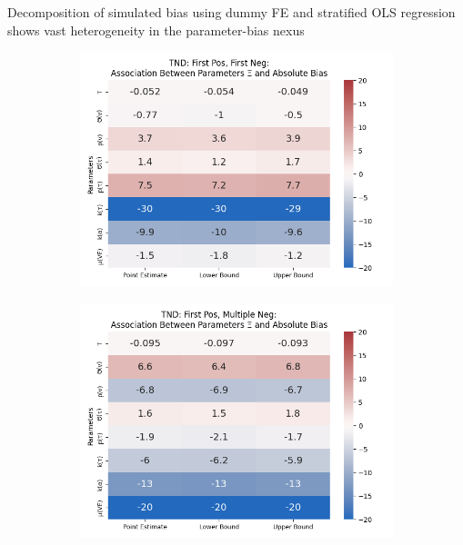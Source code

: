 \documentclass[aspectratio=169]{beamer}
\begin{document}
\begin{frame}{Decomposition of simulated bias using dummy FE and stratified OLS regression shows vast heterogeneity in the parameter-bias nexus}
\begin{figure}[H]
		\begin{subfigure}[t]{0.23\linewidth}
			\centering
			\includegraphics[scale=0.25]{VEMethod_Drivers1b_FEest_Li_MSpec_Heatmap9.png}
		\end{subfigure}
		\begin{subfigure}[t]{0.23\linewidth}
			\centering
			\includegraphics[scale=0.25]{VEMethod_Drivers1b_FEest_Li_MSpec_Heatmap10.png}
		\end{subfigure}
	\end{figure}
\end{frame}
\end{document}
